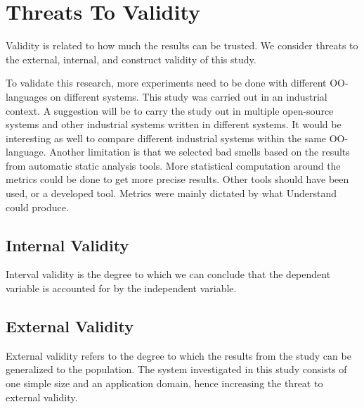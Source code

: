 




\section{Threats To Validity}
\label{sub:threats_to_validity}
Validity is related to how much the results can be trusted\cite{Wohlin:2000:ESE:330775}. We consider threats to the external, internal, and construct validity of this study.

To validate this research, more experiments need to be done with different OO-languages on different systems. This study was carried out in an industrial context. A suggestion will be to carry the study out in multiple open-source systems and other industrial systems written in different systems. It would be interesting as well to compare different industrial systems within the same OO-language. Another limitation is that we selected bad smells based on the results from automatic static analysis tools. More statistical computation around the metrics could be done to get more precise results. Other tools should have been used, or a developed tool. Metrics were mainly dictated by what Understand could produce. 

\subsection{Internal Validity}
\label{sub:internal_validty}
Interval validity is the degree to which we can conclude that the dependent variable is accounted for by the independent variable.




\subsection{External Validity}
\label{sub:external_validity}
External validity refers to the degree to which the results from the study can be generalized to the population. The system investigated in this study consists of one simple size and an application domain, hence increasing the threat to external validity. 

